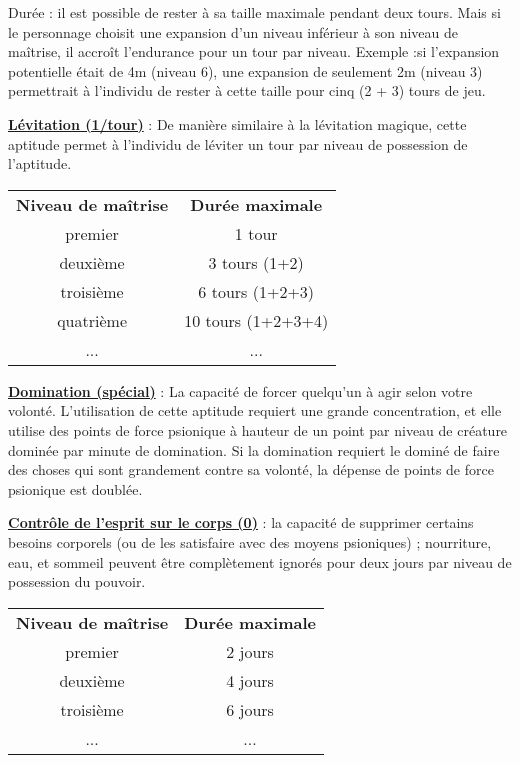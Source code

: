 Durée : il est possible de rester à sa taille maximale pendant deux tours. Mais si le personnage choisit une expansion d'un niveau inférieur à son niveau de maîtrise, il accroît l'endurance pour un tour par niveau. Exemple :si l'expansion potentielle était de 4m (niveau 6), une expansion de seulement 2m (niveau 3) permettrait à l'individu de rester à cette taille pour cinq (2 + 3) tours de jeu.

\bigskip

\label{guerrier-levitation}\textbf{\uline{Lévitation (1/tour)}} : De manière similaire à la lévitation magique, cette aptitude permet à l'individu de léviter un tour par niveau de possession de l'aptitude.

\bigskip

\begin{tabular}{cc}
\textbf{Niveau de maîtrise} & \textbf{Durée maximale} \\
premier     & 1 tour \\
deuxième    & 3 tours (1+2) \\
troisième   & 6 tours (1+2+3) \\
quatrième   & 10 tours (1+2+3+4) \\
...         & ... \\
\end{tabular}

\bigskip

\label{guerrier-domination}\textbf{\uline{Domination (spécial)}} : La capacité de forcer quelqu'un à agir selon votre volonté. L'utilisation de cette aptitude requiert une grande concentration, et elle utilise des points de force psionique à hauteur de un point par niveau de créature dominée par minute de domination. Si la domination requiert le dominé de faire des choses qui sont grandement contre sa volonté, la dépense de points de force psionique est doublée.

\bigskip

\label{guerrier-controle-ESC}\textbf{\uline{Contrôle de l'esprit sur le corps (0)}} : la capacité de supprimer certains besoins corporels (ou de les satisfaire avec des moyens psioniques) ; nourriture, eau, et sommeil peuvent être complètement ignorés pour deux jours par niveau de possession du pouvoir.

\bigskip

\begin{tabular}{cc}
\textbf{Niveau de maîtrise} & \textbf{Durée maximale} \\
premier     & 2 jours \\
deuxième    & 4 jours \\
troisième   & 6 jours \\
...         & ... \\
\end{tabular}

